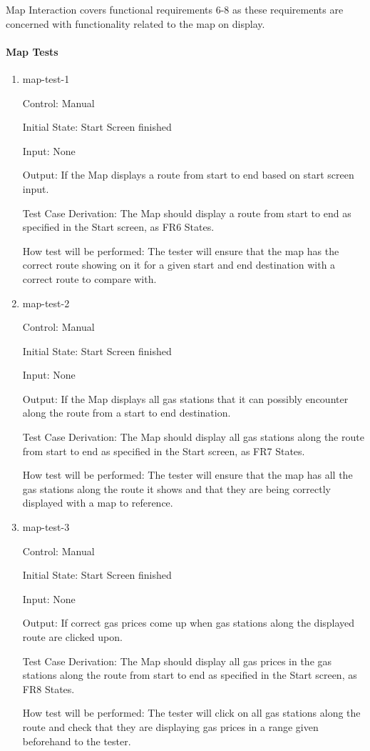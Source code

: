 \documentclass[12pt, titlepage]{article}
\begin{document}
Map Interaction covers functional requirements 6-8 as these requirements 
are concerned with functionality related to the map on display.
		
\paragraph{Map Tests}

\begin{enumerate}

\item{map-test-1\\}

Control: Manual
					
Initial State: Start Screen finished
					
Input: None
					
Output: If the Map displays a route from start to end based on start screen input.

Test Case Derivation: The Map should display a route from start to end as specified in the Start screen, as FR6 States.
					
How test will be performed: The tester will ensure that the map has the correct route showing on it for a given start and 
end destination with a correct route to compare with.
					
\item{map-test-2\\}

Control: Manual
					
Initial State: Start Screen finished
					
Input: None
					
Output: If the Map displays all gas stations that it can possibly encounter along the route from a start to end destination.

Test Case Derivation: The Map should display all gas stations along the route from start to end as specified in the Start screen, as FR7 States.
					
How test will be performed: The tester will ensure that the map has all the gas stations along the route it shows and that 
they are being correctly displayed with a map to reference.
					
\item{map-test-3\\}

Control: Manual
					
Initial State: Start Screen finished
					
Input: None
					
Output: If correct gas prices come up when gas stations along the displayed route are clicked upon.

Test Case Derivation: The Map should display all gas prices in the gas stations along the route from start to end as specified in the Start screen, as FR8 States.
					
How test will be performed: The tester will click on all gas stations along the route and check that they are 
displaying gas prices in a range given beforehand to the tester.

\end{enumerate}
\end{document}
